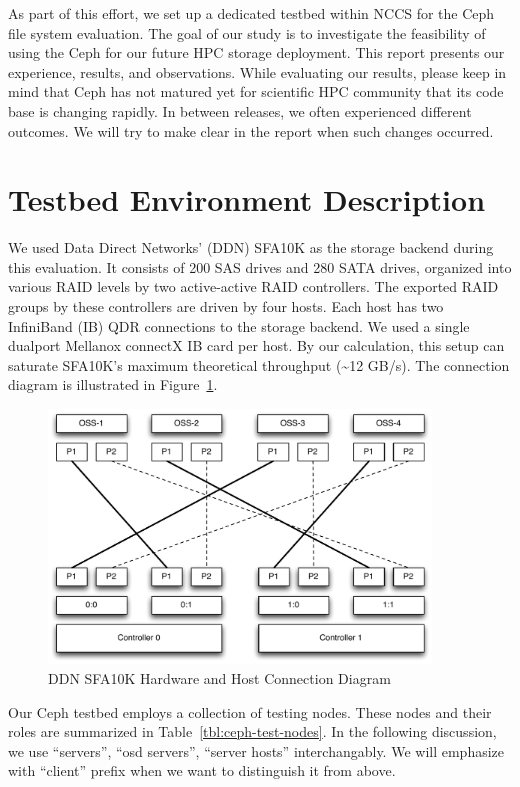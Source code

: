 \documentclass{article}
\begin{document}
As part of this effort, we set up a dedicated testbed within NCCS for the Ceph
file system evaluation. The goal of our study is to investigate the feasibility
of using the Ceph for our future HPC storage deployment.
This report presents our experience, results, and observations. While evaluating
our results, please keep in mind that Ceph has not matured yet for scientific
HPC community that its code base is changing rapidly. In between releases, we
often experienced different outcomes. We will try to make clear in the report
when such changes occurred.

\section{Testbed Environment Description}

We used Data Direct Networks' (DDN) SFA10K as the storage backend during this
evaluation. It consists of 200 SAS drives and 280 SATA drives, organized into
various RAID levels by two active-active RAID controllers. The exported RAID
groups by these controllers are driven by four hosts.
Each host has two InfiniBand (IB) QDR connections to the storage backend.
We used a single dualport Mellanox connectX IB card per host.
By our calculation, this setup can saturate SFA10K's maximum theoretical
throughput (\textasciitilde 12 GB/s). The connection diagram is illustrated in
Figure~\ref{fig:ddn-sfa10k}.

\begin{figure}[htb]
\centering
\includegraphics[width=4in]{figs/sfa10k}
\caption{DDN SFA10K Hardware and Host Connection Diagram}
\label{fig:ddn-sfa10k}
\end{figure}


Our Ceph testbed employs a collection of testing nodes. These nodes and their
roles are summarized in Table~\ref{tbl:ceph-test-nodes}. In the following
discussion, we use ``servers'', ``osd servers'', ``server hosts''
interchangably. We will emphasize with ``client'' prefix when we want to
distinguish it from above.
\end{document}
